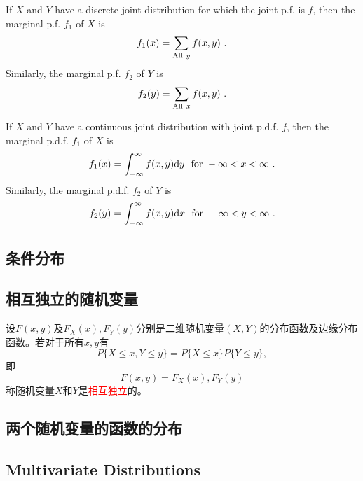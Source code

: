 \documentclass[12pt,a4paper]{article}
\newcommand{\dif}{\mathrm{d}}
\begin{document}
If $X$ and $Y$ have a discrete joint distribution for which the joint p.f. is $f$, then the marginal p.f. $f_1$ of $X$ is
\begin{equation}
f_1(x) = \sum_{{\rm All}~ y} f(x,y) ~.
\end{equation}
Similarly, the marginal p.f. $f_2$ of $Y$ is 
\begin{equation}
f_2(y) = \sum_{{\rm All}~ x} f(x,y) ~.
\end{equation}

If $X$ and $Y$ have a continuous joint distribution with joint p.d.f. $f$, then the marginal p.d.f. $f_1$ of $X$ is
\begin{equation}
f_1(x) = \int_{-\infty}^\infty f(x,y) \dif y ~~{\rm for} ~ -\infty < x < \infty ~.
\end{equation}
Similarly, the marginal p.d.f. $f_2$ of $Y$ is
\begin{equation}
f_2(y) = \int_{-\infty}^\infty f(x,y) \dif x ~~{\rm for} ~ -\infty < y < \infty ~.
\end{equation}

\subsection{条件分布}






\subsection{相互独立的随机变量}
设$F(x, y)$及$F_X(x), F_Y(y)$分别是二维随机变量$(X, Y)$的分布函数及边缘分布函数。若对于所有$x, y$有
\begin{equation}
P\{X \leqslant x, Y \leqslant y \} = P\{ X \leqslant x \} P\{ Y \leqslant y \} ,
\end{equation}
即
\begin{equation}
F(x, y) = F_X(x), F_Y(y)
\end{equation}
称随机变量$X$和$Y$是\textcolor{red}{相互独立}的。

\subsection{两个随机变量的函数的分布}






\subsection{Multivariate Distributions}
\end{document}
